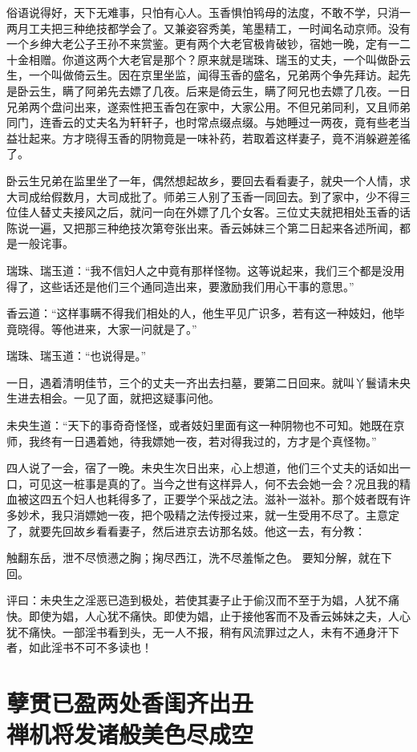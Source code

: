 \documentclass[a4paper,12pt,UTF8,twoside]{ctexbook}
\begin{document}
俗语说得好，天下无难事，只怕有心人。玉香惧怕鸨母的法度，不敢不学，只消一两月工夫把三种绝技都学会了。又兼姿容秀美，笔墨精工，一时闻名动京师。没有一个乡绅大老公子王孙不来赏鉴。更有两个大老官极肯破钞，宿她一晚，定有一二十金相赠。你道这两个大老官是那个？原来就是瑞珠、瑞玉的丈夫，一个叫做卧云生，一个叫做倚云生。因在京里坐监，闻得玉香的盛名，兄弟两个争先拜访。起先是卧云生，瞒了阿弟先去嫖了几夜。后来是倚云生，瞒了阿兄也去嫖了几夜。一日兄弟两个盘问出来，遂索性把玉香包在家中，大家公用。不但兄弟同利，又且师弟同门，连香云的丈夫名为轩轩子，也时常点缀点缀。与她睡过一两夜，竟有些老当益壮起来。方才晓得玉香的阴物竟是一味补药，若取着这样妻子，竟不消躲避差徭了。

卧云生兄弟在监里坐了一年，偶然想起故乡，要回去看看妻子，就央一个人情，求大司成给假数月，大司成批了。师弟三人别了玉香一同回去。到了家中，少不得三位佳人替丈夫接风之后，就问一向在外嫖了几个女客。三位丈夫就把相处玉香的话陈说一遍，又把那三种绝技次第夸张出来。香云姊妹三个第二日起来各述所闻，都是一般诧事。

瑞珠、瑞玉道：“我不信妇人之中竟有那样怪物。这等说起来，我们三个都是没用得了，这些话还是他们三个通同造出来，要激励我们用心干事的意思。”

香云道：“这样事瞒不得我们相处的人，他生平见广识多，若有这一种妓妇，他毕竟晓得。等他进来，大家一问就是了。”

瑞珠、瑞玉道：“也说得是。”

一日，遇着清明佳节，三个的丈夫一齐出去扫墓，要第二日回来。就叫丫鬟请未央生进去相会。一见了面，就把这疑事问他。

未央生道：“天下的事奇奇怪怪，或者妓妇里面有这一种阴物也不可知。她既在京师，我终有一日遇着她，待我嫖她一夜，若对得我过的，方才是个真怪物。”

四人说了一会，宿了一晚。未央生次日出来，心上想道，他们三个丈夫的话如出一口，可见这一桩事是真的了。当今之世有这样异人，何不去会她一会？况且我的精血被这四五个妇人也耗得多了，正要学个采战之法。滋补一滋补。那个妓者既有许多妙术，我只消嫖她一夜，把个吸精之法传授过来，就一生受用不尽了。主意定了，就要先回故乡看看妻子，然后进京去访那名妓。他这一去，有分教：

触翻东岳，泄不尽愤懑之胸；掬尽西江，洗不尽羞惭之色。
要知分解，就在下回。

评曰：未央生之淫恶已造到极处，若使其妻子止于偷汉而不至于为娼，人犹不痛快。即使为娼，人心犹不痛快。即使为娼，止于接他客而不及香云姊妹之夫，人心犹不痛快。一部淫书看到头，无一人不报，稍有风流罪过之人，未有不通身汗下者，如此淫书不可不多读也！

\chapter[孽贯已盈两处香闺齐出丑\ 禅机将发诸般美色尽成空]{孽贯已盈两处香闺齐出丑\\禅机将发诸般美色尽成空}
\end{document}
